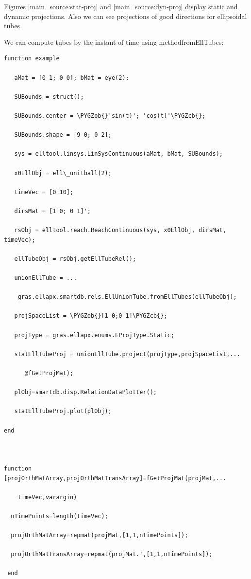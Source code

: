 \documentclass[letterpaper,10pt,english]{sphinxmanual}
\def\PYGZob{\char`\{}
\def\PYGZcb{\char`\}}
\begin{document}
Figures \hyperref[main_source:stat-proj]{ \ref*{main_source:stat-proj}} and \hyperref[main_source:dyn-proj]{ \ref*{main_source:dyn-proj}} display static and dynamic projections.
Also we can see projections of good directions for ellipsoidal tubes.

We can compute tubes by the instant of time using methodfromEllTubes:

\begin{Verbatim}[commandchars=\\\{\}]
function example

   aMat = [0 1; 0 0]; bMat = eye(2);  

   SUBounds = struct();

   SUBounds.center = \PYGZob{}'sin(t)'; 'cos(t)'\PYGZcb{};  

   SUBounds.shape = [9 0; 0 2]; 

   sys = elltool.linsys.LinSysContinuous(aMat, bMat, SUBounds);

   x0EllObj = ell\_unitball(2);

   timeVec = [0 10]; 

   dirsMat = [1 0; 0 1]';  

   rsObj = elltool.reach.ReachContinuous(sys, x0EllObj, dirsMat, timeVec);

   ellTubeObj = rsObj.getEllTubeRel();

   unionEllTube = ...

    gras.ellapx.smartdb.rels.EllUnionTube.fromEllTubes(ellTubeObj);

   projSpaceList = \PYGZob{}[1 0;0 1]\PYGZcb{};

   projType = gras.ellapx.enums.EProjType.Static;

   statEllTubeProj = unionEllTube.project(projType,projSpaceList,...

      @fGetProjMat);

   plObj=smartdb.disp.RelationDataPlotter();

   statEllTubeProj.plot(plObj);

end



function [projOrthMatArray,projOrthMatTransArray]=fGetProjMat(projMat,...

    timeVec,varargin)

  nTimePoints=length(timeVec);

  projOrthMatArray=repmat(projMat,[1,1,nTimePoints]);

  projOrthMatTransArray=repmat(projMat.',[1,1,nTimePoints]);

 end
\end{Verbatim}
\end{document}
